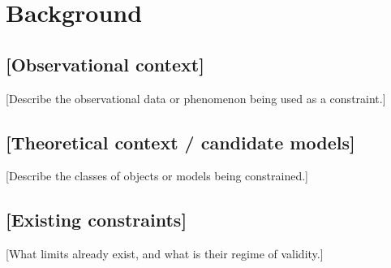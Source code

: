 \section{Background}
\label{sec:background}


\subsection{[Observational context]}

[Describe the observational data or phenomenon being used as a constraint.]

\subsection{[Theoretical context / candidate models]}

[Describe the classes of objects or models being constrained.]

\subsection{[Existing constraints]}

[What limits already exist, and what is their regime of validity.]
